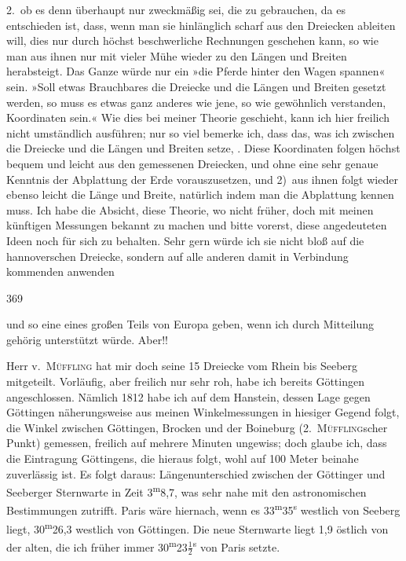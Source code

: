\par\noindent\hspace*{\parindent}2.\ ob es denn überhaupt nur zweckmäßig sei, die  zu gebrauchen, da es entschieden ist, dass, wenn man sie hinlänglich scharf aus den Dreiecken ableiten will, dies nur durch höchst beschwerliche Rechnungen geschehen kann, so wie man aus ihnen nur mit vieler Mühe wieder zu den Längen und Breiten herabsteigt.
Das Ganze würde nur ein »die Pferde hinter den Wagen spannen« sein.
»Soll etwas Brauchbares  die Dreiecke und die Längen und Breiten gesetzt werden, so muss es etwas ganz anderes wie jene, so wie gewöhnlich verstanden, Koordinaten sein.«
Wie dies bei meiner Theorie geschieht, kann ich hier freilich nicht umständlich ausführen; nur so viel bemerke ich, dass das, was ich zwischen die Dreiecke und die Längen und Breiten setze, .
Diese Koordinaten folgen höchst bequem und leicht aus den gemessenen Dreiecken, und ohne eine sehr genaue Kenntnis der Abplattung der Erde vorauszusetzen, und 2)~aus ihnen folgt wieder ebenso leicht die Länge und Breite, natürlich indem man die Abplattung kennen muss.
Ich habe die Absicht, diese Theorie, wo nicht früher, doch mit meinen künftigen Messungen bekannt zu machen und bitte vorerst, diese angedeuteten Ideen noch für sich zu behalten.
Sehr gern würde ich sie nicht bloß auf die hannoverschen Dreiecke, sondern auf alle anderen damit in Verbindung kommenden anwenden
\par\clearpage
{}\hfill369\par\medskip
\noindent und so eine  eines großen Teils von Europa geben, wenn ich durch Mitteilung gehörig unterstützt würde.
Aber!!

\par\noindent\hspace*{\parindent}Herr v.\ \textsc{Müffling} hat mir doch seine 15 Dreiecke vom Rhein bis Seeberg mitgeteilt.
Vorläufig, aber freilich nur sehr roh, habe ich bereits Göttingen angeschlossen.
Nämlich 1812 habe ich auf dem Hanstein, dessen Lage gegen Göttingen näherungsweise aus meinen Winkelmessungen in hiesiger Gegend folgt, die Winkel zwischen Göttingen, Brocken und der Boineburg (2.~\textsc{Müffling}scher Punkt) gemessen, freilich auf mehrere Minuten ungewiss; doch glaube ich, dass die Eintragung Göttingens, die hieraus folgt, wohl auf 100 Meter beinahe zuverlässig ist.
Es folgt daraus: Längenunterschied zwischen der Göttinger und Seeberger Sternwarte in Zeit \mbox{3\textsuperscript{m}8,7}, was sehr nahe mit den astronomischen Bestimmungen zutrifft.
Paris wäre hiernach, wenn es \mbox{33\textsuperscript{m}35\textsuperscript{s}} westlich von Seeberg liegt, \mbox{30\textsuperscript{m}26,3} westlich von Göttingen.
Die neue Sternwarte liegt \mbox{1,9} östlich von der alten, die ich früher immer \mbox{30\textsuperscript{m}23\(\tfrac{1}{2}\)\textsuperscript{s}} von Paris setzte.
